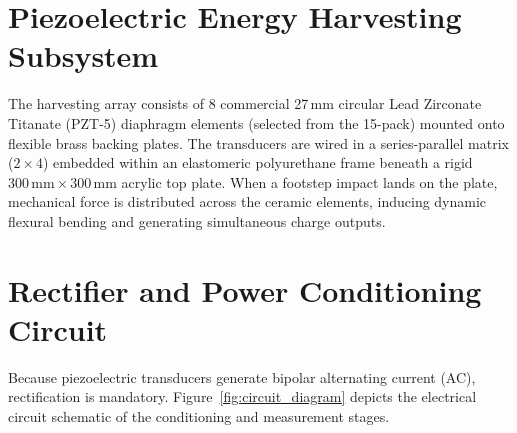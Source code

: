 \section{Piezoelectric Energy Harvesting Subsystem}
The harvesting array consists of 8 commercial 27\,mm circular Lead Zirconate Titanate (PZT-5) diaphragm elements (selected from the 15-pack) mounted onto flexible brass backing plates. The transducers are wired in a series-parallel matrix ($2 \times 4$) embedded within an elastomeric polyurethane frame beneath a rigid $300\,\text{mm} \times 300\,\text{mm}$ acrylic top plate. When a footstep impact lands on the plate, mechanical force is distributed across the ceramic elements, inducing dynamic flexural bending and generating simultaneous charge outputs.

\section{Rectifier and Power Conditioning Circuit}
Because piezoelectric transducers generate bipolar alternating current (AC), rectification is mandatory. Figure~\ref{fig:circuit_diagram} depicts the electrical circuit schematic of the conditioning and measurement stages.

